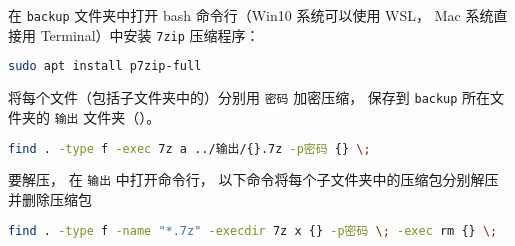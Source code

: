 在 \verb|backup| 文件夹中打开 bash 命令行（Win10 系统可以使用 WSL， Mac 系统直接用 Terminal）中安装 \verb|7zip| 压缩程序：
\begin{lstlisting}[language=bash]
sudo apt install p7zip-full
\end{lstlisting}
将每个文件（包括子文件夹中的）分别用 \verb|密码| 加密压缩， 保存到 \verb|backup| 所在文件夹的 \verb|输出| 文件夹（）。
\begin{lstlisting}[language=bash]
find . -type f -exec 7z a ../输出/{}.7z -p密码 {} \;
\end{lstlisting}
要解压， 在 \verb|输出| 中打开命令行， 以下命令将每个子文件夹中的压缩包分别解压并删除压缩包
\begin{lstlisting}[language=bash]
find . -type f -name "*.7z" -execdir 7z x {} -p密码 \; -exec rm {} \;
\end{lstlisting}
